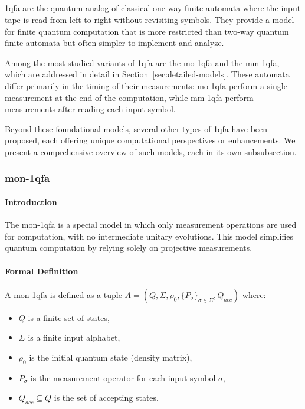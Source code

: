 \subsection{}
\label{sec:1-way-qfa}

\gls{1qfa} are the quantum analog of classical one-way finite automata where the input tape is read from left to right without revisiting symbols. They provide a model for finite quantum computation that is more restricted than two-way quantum finite automata but often simpler to implement and analyze.

Among the most studied variants of \gls{1qfa} are the \gls{mo-1qfa} and the \gls{mm-1qfa}, which are addressed in detail in Section~\ref{sec:detailed-models}. These automata differ primarily in the timing of their measurements: \gls{mo-1qfa} perform a single measurement at the end of the computation, while \gls{mm-1qfa} perform measurements after reading each input symbol.

Beyond these foundational models, several other types of \gls{1qfa} have been proposed, each offering unique computational perspectives or enhancements. We present a comprehensive overview of such models, each in its own subsubsection.

\subsubsection{\gls{mon-1qfa}}
\paragraph{Introduction}
The \gls{mon-1qfa} is a special model in which only measurement operations are used for computation, with no intermediate unitary evolutions. This model simplifies quantum computation by relying solely on projective measurements.

\paragraph{Formal Definition}
A \gls{mon-1qfa} is defined as a tuple \( A = (Q, \Sigma, \rho_0, \{P_{\sigma}\}_{\sigma \in \Sigma}, Q_{acc}) \) where:
\begin{itemize}
    \item \( Q \) is a finite set of states,
    \item \( \Sigma \) is a finite input alphabet,
    \item \( \rho_0 \) is the initial quantum state (density matrix),
    \item \( P_{\sigma} \) is the measurement operator for each input symbol \( \sigma \),
    \item \( Q_{acc} \subseteq Q \) is the set of accepting states.
\end{itemize}

